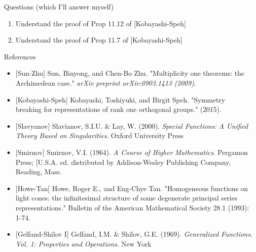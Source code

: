 \documentclass[8pt]{beamer}
\theoremstyle{mystyle}
\begin{document}
\begin{frame}{Questions (which I'll answer myself)}
	\begin{enumerate}
		\item Understand the proof of Prop 11.12 of [Kobayashi-Speh]
		\item Understand the proof of Prop 11.7 of [Kobayashi-Speh]
	\end{enumerate}
\end{frame}
\begin{frame}{References}
	\begin{itemize}
		\item {[Sun-Zhu]} Sun, Binyong, and Chen-Bo Zhu. "Multiplicity one theorems: the Archimedean case." 
			{\it arXiv preprint arXiv:0903.1413 (2009)}.
		\item {[Kobayashi-Speh]} Kobayashi, Toshiyuki, and Birgit Speh. "Symmetry breaking for representations of rank one orthogonal groups." (2015).
		\item {[Slavyanov]} Slavianov, S.I.U. \&
			Lay, W. (2000). {\it Special Functions: A Unified Theory Based on Singularities}. Oxford University Press
		\item {[Smirnov]} Smirnov, V.I. (1964). {\it A Course of Higher Mathematics}.
			Pergamon Press; [U.S.A. ed. distributed by Addison-Wesley Publishing Company, Reading, Mass.
			\item {[Howe-Tan]} Howe, Roger E., and Eng-Chye Tan. "Homogeneous functions on light cones: the infinitesimal structure of some degenerate principal series representations." Bulletin of the American Mathematical Society 28.1 (1993): 1-74.
		\item {[Gelfand-Shilov I]} Gelfand, I.M. \& Shilov, G.E. (1969).
				{\it Generalized Functions. Vol. 1: Properties and Operations}. New York
	\end{itemize}
\end{frame}
\end{document}
